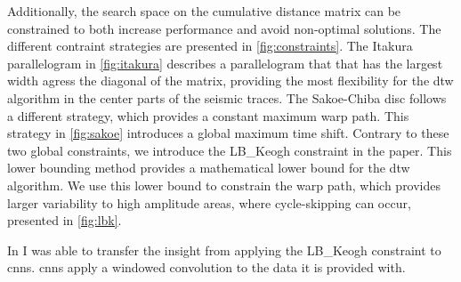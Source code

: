 Additionally, the search space on the cumulative distance matrix can be constrained to both increase performance and avoid non-optimal solutions. The different contraint strategies are presented in \cref{fig:constraints}. The Itakura parallelogram \citep{Itakura1975} in \cref{fig:itakura} describes a parallelogram that that has the largest width agress the diagonal of the matrix, providing the most flexibility for the \ac{dtw} algorithm in the center parts of the seismic traces. The Sakoe-Chiba disc \citep{Sakoe1978} follows a different strategy, which provides a constant maximum warp path. This strategy in \cref{fig:sakoe} introduces a global maximum time shift. Contrary to these two global constraints, we introduce the LB\_Keogh constraint in the paper. This lower bounding method provides a mathematical lower bound for the \ac{dtw} algorithm. We use this lower bound to constrain the warp path, which provides larger variability to high amplitude areas, where cycle-skipping can occur, presented in \cref{fig:lbk}. 

In \citet{dramsch2018information} I was able to transfer the insight from applying the LB\_Keogh constraint to \aclp{cnn}. \acp{cnn} apply a windowed convolution to the data it is provided with. 



